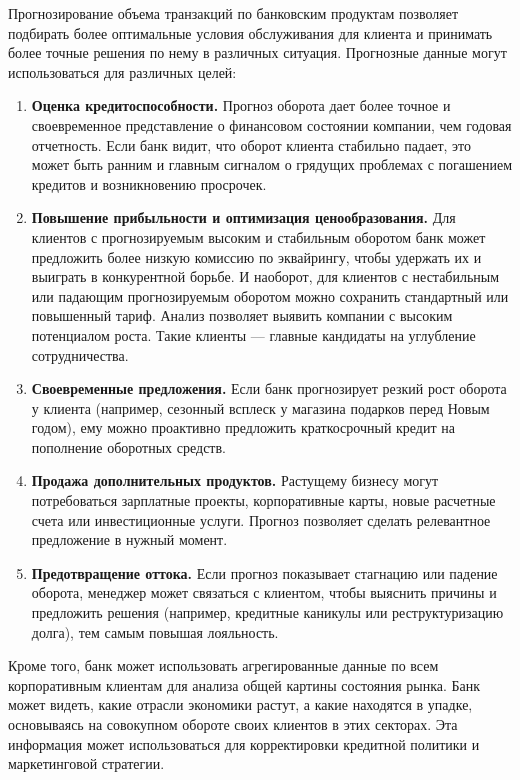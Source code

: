 Прогнозирование объема транзакций по банковским продуктам позволяет подбирать более оптимальные условия обслуживания для клиента и принимать более точные решения по нему в различных ситуация. Прогнозные данные могут использоваться для различных целей:
\begin{enumerate}
	\item \textbf{Оценка кредитоспособности.} Прогноз оборота дает более точное и своевременное представление о финансовом состоянии компании, чем годовая отчетность. Если банк видит, что оборот клиента стабильно падает, это может быть ранним и главным сигналом о грядущих проблемах с погашением кредитов и возникновению просрочек.
	\item \textbf{Повышение прибыльности и оптимизация ценообразования.} Для клиентов с прогнозируемым высоким и стабильным оборотом банк может предложить более низкую комиссию по эквайрингу, чтобы удержать их и выиграть в конкурентной борьбе. И наоборот, для клиентов с нестабильным или падающим прогнозируемым оборотом можно сохранить стандартный или повышенный тариф. Анализ позволяет выявить компании с высоким потенциалом роста. Такие клиенты — главные кандидаты на углубление сотрудничества.
	\item \textbf{Своевременные предложения.} Если банк прогнозирует резкий рост оборота у клиента (например, сезонный всплеск у магазина подарков перед Новым годом), ему можно проактивно предложить краткосрочный кредит на пополнение оборотных средств.
	\item \textbf{Продажа дополнительных продуктов.} Растущему бизнесу могут потребоваться зарплатные проекты, корпоративные карты, новые расчетные счета или инвестиционные услуги. Прогноз позволяет сделать релевантное предложение в нужный момент.
	\item \textbf{Предотвращение оттока.} Если прогноз показывает стагнацию или падение оборота, менеджер может связаться с клиентом, чтобы выяснить причины и предложить решения (например, кредитные каникулы или реструктуризацию долга), тем самым повышая лояльность.
\end{enumerate}

Кроме того, банк может использовать агрегированные данные по всем корпоративным клиентам для анализа общей картины состояния рынка. Банк может видеть, какие отрасли экономики растут, а какие находятся в упадке, основываясь на совокупном обороте своих клиентов в этих секторах. Эта информация может использоваться для корректировки кредитной политики и маркетинговой стратегии.

